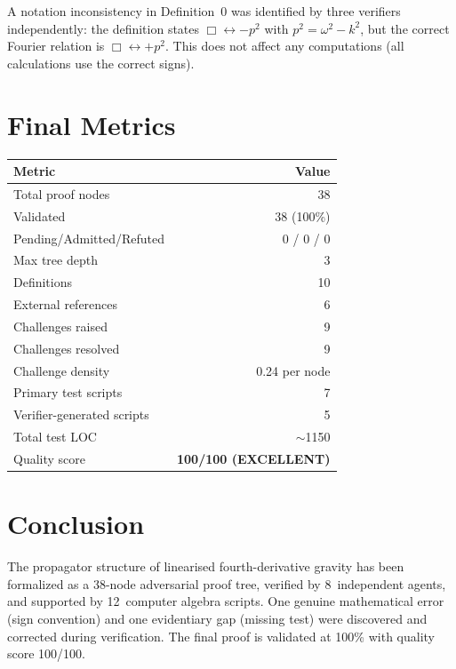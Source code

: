 \documentclass[11pt,a4paper]{article}
\newcommand{\dbox}{\Box}
\begin{document}
A notation inconsistency in Definition~0 was identified by three verifiers
independently: the definition states $\dbox \leftrightarrow -p^2$ with
$p^2 = \omega^2 - k^2$, but the correct Fourier relation is
$\dbox \leftrightarrow +p^2$. This does not affect any computations (all
calculations use the correct signs).

\section{Final Metrics}
\label{sec:metrics}

\begin{center}
\begin{tabular}{lr}
\toprule
\textbf{Metric} & \textbf{Value} \\
\midrule
Total proof nodes & 38 \\
Validated & 38 (100\%) \\
Pending/Admitted/Refuted & 0 / 0 / 0 \\
Max tree depth & 3 \\
Definitions & 10 \\
External references & 6 \\
Challenges raised & 9 \\
Challenges resolved & 9 \\
Challenge density & 0.24 per node \\
Primary test scripts & 7 \\
Verifier-generated scripts & 5 \\
Total test LOC & $\sim$1150 \\
Quality score & \textbf{100/100 (EXCELLENT)} \\
\bottomrule
\end{tabular}
\end{center}

\section{Conclusion}
\label{sec:conclusion}

The propagator structure of linearised fourth-derivative gravity has been
formalized as a 38-node adversarial proof tree, verified by 8~independent
agents, and supported by 12~computer algebra scripts. One genuine mathematical
error (sign convention) and one evidentiary gap (missing test) were discovered
and corrected during verification. The final proof is validated at 100\%
with quality score 100/100.
\end{document}
